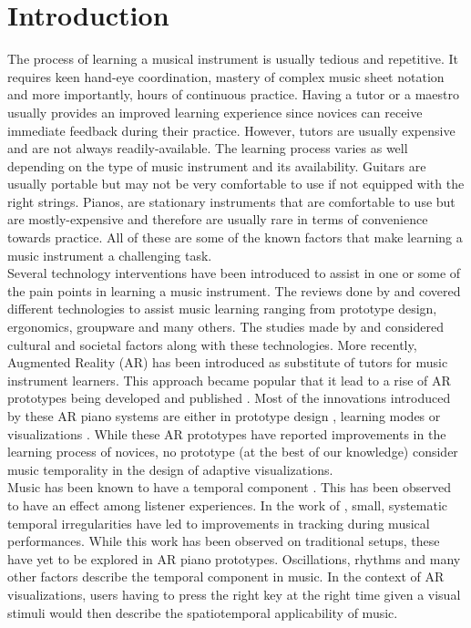 \documentclass[manuscript,screen]{acmart}
\begin{document}
\section{Introduction}
The process of learning a musical instrument is usually tedious and repetitive. It requires keen hand-eye coordination, mastery of complex music sheet notation and more importantly, hours of continuous practice. Having a tutor or a maestro usually provides an improved learning experience since novices can receive immediate feedback during their practice. However, tutors are usually expensive and are not always readily-available. The learning process varies as well depending on the type of music instrument and its availability. Guitars are usually portable but may not be very comfortable to use if not equipped with the right strings. Pianos, are stationary instruments that are comfortable to use but are mostly-expensive and therefore are usually rare in terms of convenience towards practice. All of these are some of the known factors that make learning a music instrument a challenging task.\\

Several technology interventions have been introduced to assist in one or some of the pain points in learning a music instrument. The reviews done by \citet{fober2007vemus} and \citet{daniel2006exploring} covered different technologies to assist music learning ranging from prototype design, ergonomics, groupware and many others. The studies made by \citet{creech2010learning} and \citet{cope1997cultural} considered cultural and societal factors along with these technologies. More recently, Augmented Reality (AR) has been introduced as substitute of tutors for music instrument learners. This approach became popular that it lead to a rise of AR prototypes being  developed and published  \cite{santos2013augmented}. Most of the innovations introduced by these AR piano systems are either in prototype design \cite{barakonyi2005augmented, huang2011piano}, learning modes \cite{rogers2014piano} or visualizations \cite{chow2013music}. While these AR prototypes have reported improvements in the learning process of novices, no prototype (at the best of our knowledge) consider music temporality in the design of adaptive visualizations. \\

Music has been known to have a temporal component \cite{lippman1984progressive}. This has been observed to have an effect among listener experiences. In the work of \citet{large2002perceiving}, small, systematic temporal irregularities have led to improvements in tracking during musical performances. While this work has been observed on traditional setups, these have yet to be explored in AR piano prototypes. Oscillations, rhythms and many other factors describe the temporal component in music. In the context of AR visualizations, users having to press the right key at the right time given a visual stimuli would then describe the spatiotemporal applicability of music.\\
\end{document}
